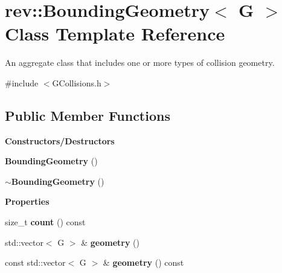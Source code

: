\hypertarget{classrev_1_1_bounding_geometry}{}\section{rev\+::Bounding\+Geometry$<$ G $>$ Class Template Reference}
\label{classrev_1_1_bounding_geometry}


An aggregate class that includes one or more types of collision geometry.  




{\ttfamily \#include $<$G\+Collisions.\+h$>$}

\subsection*{Public Member Functions}
\begin{Indent}\textbf{ Constructors/\+Destructors}\par
\begin{DoxyCompactItemize}
\item 
\mbox{\label{classrev_1_1_bounding_geometry_a082dee48d337860df9680a4317aef810}} 
{\bfseries Bounding\+Geometry} ()
\item 
\mbox{\label{classrev_1_1_bounding_geometry_a86b10806030016c42fcd44f2047d821b}} 
{\bfseries $\sim$\+Bounding\+Geometry} ()
\end{DoxyCompactItemize}
\end{Indent}
\begin{Indent}\textbf{ Properties}\par
\begin{DoxyCompactItemize}
\item 
\mbox{\label{classrev_1_1_bounding_geometry_a011b9e5cd68ab5625764c35f3479ccf5}} 
size\+\_\+t {\bfseries count} () const
\item 
\mbox{\label{classrev_1_1_bounding_geometry_a1126d51f2566007f0627eda48af8206a}} 
std\+::vector$<$ G $>$ \& {\bfseries geometry} ()
\item 
\mbox{\label{classrev_1_1_bounding_geometry_a8db4e3161699ee49e74d6e1391d65812}} 
const std\+::vector$<$ G $>$ \& {\bfseries geometry} () const
\end{DoxyCompactItemize}
\end{Indent}
